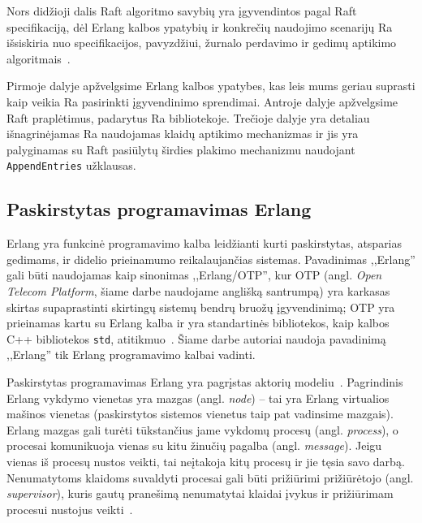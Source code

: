 \documentclass{VUMIFPSkursinis}
\begin{document}
Nors didžioji dalis Raft algoritmo savybių yra įgyvendintos pagal Raft specifikaciją, dėl Erlang kalbos ypatybių ir konkrečių naudojimo scenarijų Ra išsiskiria nuo specifikacijos, pavyzdžiui, žurnalo perdavimo ir gedimų aptikimo algoritmais~\cite{rabbitmqra}.

Pirmoje dalyje apžvelgsime Erlang kalbos ypatybes, kas leis mums geriau suprasti kaip veikia Ra pasirinkti įgyvendinimo sprendimai. Antroje dalyje apžvelgsime Raft praplėtimus, padarytus Ra bibliotekoje. Trečioje dalyje yra detaliau išnagrinėjamas Ra naudojamas klaidų aptikimo mechanizmas ir jis yra palyginamas su Raft pasiūlytų širdies plakimo mechanizmu naudojant \texttt{AppendEntries} užklausas.

\subsection{Paskirstytas programavimas Erlang}

Erlang yra funkcinė programavimo kalba leidžianti kurti paskirstytas, atsparias gedimams, ir didelio prieinamumo reikalaujančias sistemas. Pavadinimas ,,Erlang'' gali būti naudojamas kaip sinonimas ,,Erlang/OTP'', kur OTP (angl. \textit{Open Telecom Platform}, šiame darbe naudojame anglišką santrumpą) yra karkasas skirtas supaprastinti skirtingų sistemų bendrų bruožų įgyvendinimą; OTP yra prieinamas kartu su Erlang kalba ir yra standartinės bibliotekos, kaip kalbos C++ bibliotekos \texttt{std}, atitikmuo~\cite{erlang_introduction}. Šiame darbe autoriai naudoja pavadinimą ,,Erlang'' tik Erlang programavimo kalbai vadinti.

Paskirstytas programavimas Erlang yra pagrįstas aktorių modeliu~\cite{farrugia_towards_nodate, agha_actors_1985}. Pagrindinis Erlang vykdymo vienetas yra mazgas (angl. \textit{node}) -- tai yra Erlang virtualios mašinos vienetas (paskirstytos sistemos vienetus taip pat vadinsime mazgais). Erlang mazgas gali turėti tūkstančius jame vykdomų procesų (angl. \textit{process}), o procesai komunikuoja vienas su kitu žinučių pagalba (angl. \textit{message}). Jeigu vienas iš procesų nustos veikti, tai neįtakoja kitų procesų ir jie tęsia savo darbą. Nenumatytoms klaidoms suvaldyti procesai gali būti prižiūrimi prižiūrėtojo (angl. \textit{supervisor}), kuris gautų pranešimą nenumatytai klaidai įvykus ir prižiūrimam procesui nustojus veikti~\cite{erlang_distributed}.
\end{document}
